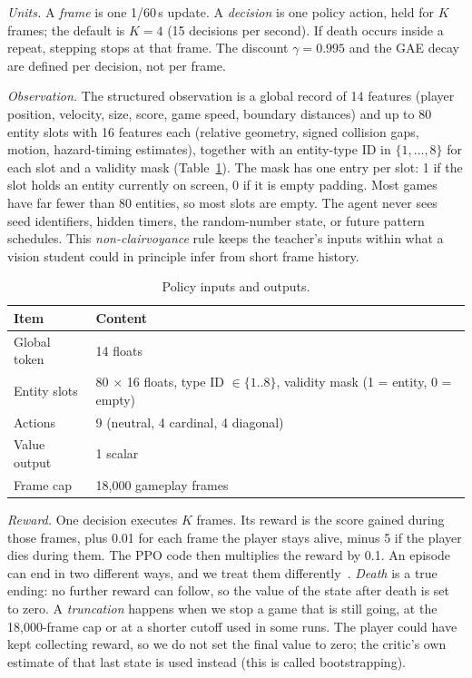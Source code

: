 \documentclass[journal]{IEEEtran}
\begin{document}
\textit{Units.} A \emph{frame} is one 1/60\,s update. A \emph{decision} is one policy action, held for $K$ frames; the default is $K=4$ (15 decisions per second). If death occurs inside a repeat, stepping stops at that frame. The discount $\gamma=0.995$ and the GAE decay are defined per decision, not per frame.

\textit{Observation.} The structured observation is a global record of 14 features (player position, velocity, size, score, game speed, boundary distances) and up to 80 entity slots with 16 features each (relative geometry, signed collision gaps, motion, hazard-timing estimates), together with an entity-type ID in $\{1,\dots,8\}$ for each slot and a validity mask (Table~\ref{tab:obs}). The mask has one entry per slot: 1 if the slot holds an entity currently on screen, 0 if it is empty padding. Most games have far fewer than 80 entities, so most slots are empty. The agent never sees seed identifiers, hidden timers, the random-number state, or future pattern schedules. This \emph{non-clairvoyance} rule keeps the teacher's inputs within what a vision student could in principle infer from short frame history.

\begin{table}[t]
\caption{Policy inputs and outputs.}\label{tab:obs}
\centering
\small
\begin{tabular}{@{}ll@{}}
\toprule
Item & Content \\
\midrule
Global token & 14 floats \\
Entity slots & 80 $\times$ 16 floats, type ID $\in\{1..8\}$, validity mask (1 = entity, 0 = empty) \\
Actions & 9 (neutral, 4 cardinal, 4 diagonal) \\
Value output & 1 scalar \\
Frame cap & 18{,}000 gameplay frames \\
\bottomrule
\end{tabular}
\end{table}

\textit{Reward.} One decision executes $K$ frames. Its reward is the score gained during those frames, plus 0.01 for each frame the player stays alive, minus 5 if the player dies during them. The PPO code then multiplies the reward by 0.1. An episode can end in two different ways, and we treat them differently~\cite{pardo2018time}. \emph{Death} is a true ending: no further reward can follow, so the value of the state after death is set to zero. A \emph{truncation} happens when we stop a game that is still going, at the 18{,}000-frame cap or at a shorter cutoff used in some runs. The player could have kept collecting reward, so we do not set the final value to zero; the critic's own estimate of that last state is used instead (this is called bootstrapping).
\end{document}
